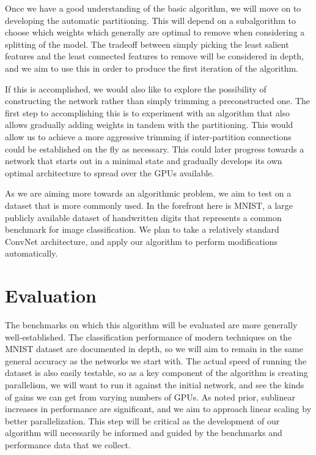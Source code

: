 \documentclass[11pt]{article}
\begin{document}
Once we have a good understanding of the basic algorithm, we will move on to developing the automatic partitioning.
This will depend on a subalgorithm to choose which weights which generally are optimal to remove when considering a splitting of the model.
The tradeoff between simply picking the least salient features and the least connected features to remove will be considered in depth, and we aim to use this in order to produce the first iteration of the algorithm.

If this is accomplished, we would also like to explore the possibility of constructing the network rather than simply trimming a preconstructed one. 
The first step to accomplishing this is to experiment with an algorithm that also allows gradually adding weights in tandem with the partitioning.
This would allow us to achieve a more aggressive trimming if inter-partition connections could be established on the fly as necessary.
This could later progress towards a network that starts out in a minimal state and gradually develops its own optimal architecture to spread over the GPUs available.

As we are aiming more towards an algorithmic problem, we aim to test on a dataset that is more commonly used.
In the forefront here is MNIST, a large publicly available dataset of handwritten digits that represents a common benchmark for image classification.
We plan to take a relatively standard ConvNet architecture, and apply our algorithm to perform modifications automatically.

\section{Evaluation}
The benchmarks on which this algorithm will be evaluated are more generally well-established.
The classification performance of modern techniques on the MNIST dataset are documented in depth, so we will aim to remain in the same general accuracy as the networks we start with.
The actual speed of running the dataset is also easily testable, so as a key component of the algorithm is creating parallelism, we will want to run it against the initial network, and see the kinds of gains we can get from varying numbers of GPUs.
As noted prior, sublinear increases in performance are significant, and we aim to approach linear scaling by better parallelization.
This step will be critical as the development of our algorithm will necessarily be informed and guided by the benchmarks and performance data that we collect.



\end{document}
